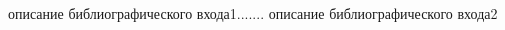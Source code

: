 \begin{thebibliography}{метка наибольшей ширины}
описание библиографического входа1.......
описание библиографического входа2
\end{thebibliography}